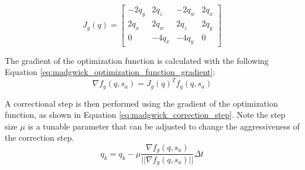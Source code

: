 \documentclass[bare_jrnl_transmag]{subfiles}
\begin{document}
\begin{equation}
    J_g(q) =
    \begin{bmatrix}
    -2q_y & 2q_z & -2q_w & 2q_x \\
    2q_x & 2q_w & 2q_z & 2q_y \\
    0 & -4q_x & -4q_y & 0
\end{bmatrix}
    \label{eq:madgwick_optimization_function_jacobian}
\end{equation}

The gradient of the optimization function is calculated with the following Equation \ref{eq:madgwick_optimization_function_gradient}:
\begin{equation}
    \nabla f_g(q, s_a) = J_g(q)^T f_g(q, s_a)
    \label{eq:madgwick_optimization_function_gradient}
\end{equation}

A correctional step is then performed using the gradient of the optimization function, as shown in Equation \ref{eq:madgwick_correction_step}. Note the step size $\mu$ is a tunable parameter that can be adjusted to change the aggressiveness of the correction step.
\begin{equation}
    q_{k} = q_{k} - \mu \frac{\nabla f_g(q, s_a)}{||\nabla f_g(q, s_a)||}\Delta t
    \label{eq:madgwick_correction_step}
\end{equation}
\end{document}
